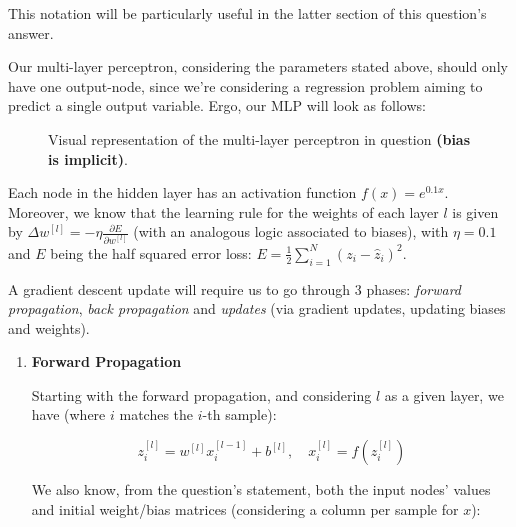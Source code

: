 \documentclass[12pt]{article}
\begin{document}
\begin{enumerate}[leftmargin=\labelsep]
        This notation will be particularly useful in the latter section of this
        question's answer.

        Our multi-layer perceptron, considering the parameters stated above, should only
        have one output-node, since we're considering a regression problem aiming to
        predict a single output variable. Ergo, our MLP will look as follows:

        \begin{figure}[H]
          \centering
          
          \caption{Visual representation of the multi-layer perceptron in question \textbf{(bias is implicit)}.}
        \end{figure}

        Each node in the hidden layer has an activation function $f(x) = e^{0.1x}$.
        Moreover, we know that the learning rule for the weights of each layer $l$
        is given by $\Delta w^{[l]} = - \eta \frac{\partial E}{\partial w^{[l]}}$ (with an analogous
        logic associated to biases), with $\eta = 0.1$ and $E$ being the half squared error loss:
        $E = \frac{1}{2} \sum_{i=1}^N (z_i - \hat{z}_i)^2$.

        \pagebreak

        A gradient descent update will require us to go through 3 phases: \emph{forward
          propagation}, \emph{back propagation} and \emph{updates} (via gradient updates, updating
        biases and weights).

        \begin{enumerate}
          \item \textbf{Forward Propagation}

                Starting with the forward propagation, and considering $l$ as a given layer,
                we have (where $i$ matches the $i$-th sample):

                \begin{equation*}
                  z_i^{[l]} = w^{[l]} x_i^{[l-1]} + b^{[l]}, \quad x_i^{[l]} = f\left(z_i^{[l]}\right)
                \end{equation*}

                We also know, from the question's statement, both the input nodes' values
                and initial weight/bias matrices (considering a column per sample for $x$):


\end{enumerate}
\end{enumerate}
\end{document}
